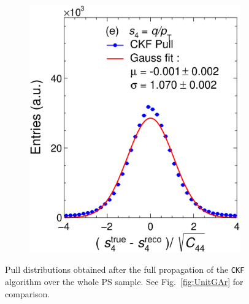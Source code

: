 \begin{figure}[!ht]
\begin{subfigure}{0.32\textwidth}
         \includegraphics[width=\textwidth]{figures/ch5-KF_NDGAr/ToySample/ParScan/UnitK_p4.eps}
         \caption{}
         \label{fig:resp4KFGAr}
     \end{subfigure}
        \caption{Pull distributions obtained after the full propagation of the \texttt{CKF} algorithm over the whole PS sample. See Fig.~\ref{fig:UnitGAr} for comparison.}
        \label{fig:UnitGArKF}
\end{figure}


